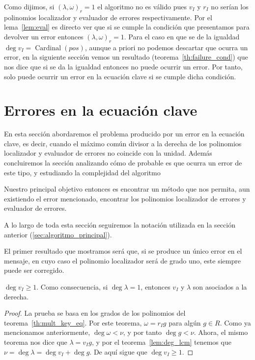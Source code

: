 Como dijimos, si \({(\lambda, \omega)}_r = 1\) el algoritmo no es válido pues \(v_I\) y  \(r_I\) no serían los polinomios localizador y evaluador de errores respectivamente. Por el lema~\ref{lem:eval} es directo ver que si se cumple la condición que presentamos para devolver un error entonces \({(\lambda, \omega)}_r = 1\). Para el caso en que se de la igualdad \(\deg v_I = \operatorname{Cardinal}(pos)\), aunque a priori no podemos descartar que ocurra un error, en la siguiente sección vemos un resultado (teorema~\ref{th:failure_cond}) que nos dice que si se da la igualdad entonces no puede ocurrir un error. Por tanto, solo puede ocurrir un error en la ecuación clave si se cumple dicha condición.

\section{Errores en la ecuación clave}%
\label{sec:errores_en_ecuación_clave}

En esta sección abordaremos el problema producido por un error en la ecuación clave, es decir, cuando el máximo común divisor a la derecha de los polinomios localizador y evaluador de errores no coincide con la unidad. Además concluiremos la sección analizando cómo de probable es que ocurra un error de este tipo, y estudiando la complejidad del algoritmo

Nuestro principal objetivo entonces es encontrar un método que nos permita, aun existiendo el error mencionado, encontrar los polinomios localizador de errores y evaluador de errores.

A lo largo de toda esta sección seguiremos la notación utilizada en la sección anterior (\ref{sec:algoritmo_principal}).

El primer resultado que mostramos será que, si se produce un único error en el mensaje, en cuyo caso el polinomio localizador será de grado uno, este siempre puede ser corregido.

\begin{lemma}
    \(\deg v_I \ge 1\). Como consecuencia, si \(\deg \lambda = 1\), entonces  \(v_I\) y  \(\lambda\) son asociados a la derecha.
\end{lemma}

\begin{proof}
    La prueba se basa en los grados de los polinomios del teorema~\ref{th:mult_key_eq}. Por este teorema, \(\omega = r_I g\) para algún \(g \in R\). Como ya mencionamos anteriormente, \(\deg \omega < \nu\), y por tanto \(\deg g < \nu\). Ahora, el mismo teorema nos dice que \(\lambda = v_I g\), y por el teorema~\ref{lem:deg_lcm} tenemos que \(\nu = \deg \lambda = \deg v_{I} + \deg g\). De aquí sigue que \(\deg v_I \ge 1\).
\end{proof}

